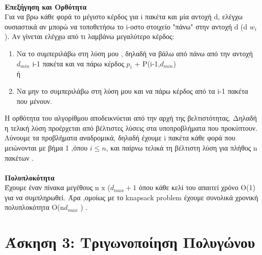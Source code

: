 \documentclass[12pt,a4paper]{article}
\begin{document}
\begin{center}
    \\
\end{center}
\textbf{Επεξήγηση και Ορθότητα} \\
Για να βρω κάθε φορά το μέγιστο κέρδος για i πακέτα και μία αντοχή d, ελέγχω ουσιαστικά αν μπορώ να τοποθετήσω το i-οστο στοιχείο "πάνω" στην αντοχή d (d \ge $w_i$ ). Αν γίνεται ελέγχω από τι λαμβάνω μεγαλύτερο κέρδος:
\begin{enumerate}
    \item Να το συμπεριλάβω στη λύση μου , δηλαδή να βάλω από πάνω από την αντοχή $d_{min}$ i-1 πακέτα και να πάρω κέρδος $p_i$ + P(i-1,$d_{min}$)\\
    ή 
    \item Να μην το συμπεριλάβω στη λύση μου και να πάρω κέρδος από τα i-1 πακέτα που μένουν.
\end{enumerate} 
Η ορθότητα του αλγορίθμου αποδεικνύεται από την αρχή της βελτιστότητας. Δηλαδή η τελική λύση προέρχεται από βέλτιστες λύσεις στα υποπροβλήματα που προκύπτουν. Λύνουμε τα προβλήματα αναδρομικά, δηλαδή έχουμε i πακέτα κάθε φορά που μειώνονται με βήμα 1 ,όπου $i \le n$, και παίρνω τελικά τη βέλτιστη λύση για πλήθος n πακέτων .\\\\
\textbf{Πολυπλοκότητα} \\
Έχουμε έναν πίνακα μεγέθους n x ($d_{max}+1$ όπου κάθε κελί του απαιτεί χρόνο Ο(1) για να συμπληρωθεί. Άρα ,ομοίως με το knapsack problem έχουμε συνολικά χρονική πολυπλοκότητα Ο(n\cdot $d_{max}$ ) . \\

\section*{Άσκηση 3: Τριγωνοποίηση Πολυγώνου}
\end{document}
